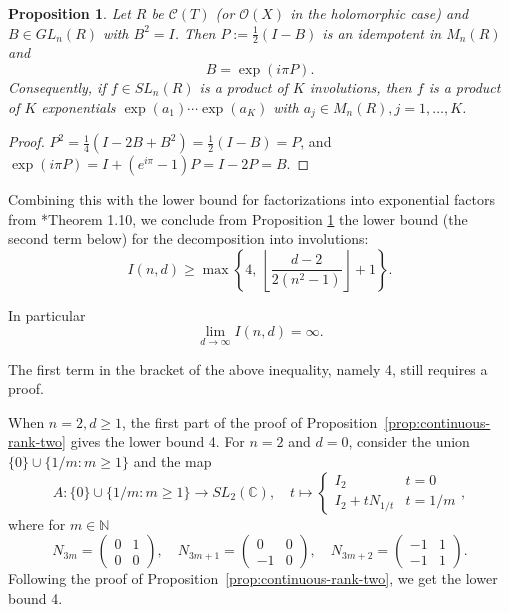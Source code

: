 \documentclass{amsart}
\newcommand{\C}{\mathbb{C}}
\newcommand{\Id}{I}
\newtheorem{proposition}[theorem]{Proposition}
\theoremstyle{definition}
\begin{document}
\begin{proposition}\label{prop:exp}
Let $R$ be $\mathcal{C}(T)$ (or $\mathcal O(X)$ in the holomorphic case) and $B\in GL_n(R)$ with $B^2=\Id$. Then $P:=\tfrac12(\Id-B)$ is an idempotent
in $M_n(R)$ and
\[
B=\exp(i\pi P).
\]
Consequently, if $f\in SL_n(R)$ is a product of $K$ involutions, then $f$ is a product of $K$ exponentials
$\exp(a_1)\cdots\exp(a_K)$ with $a_j\in M_n(R), j = 1, \dots,K$.
\end{proposition}

\begin{proof}
$P^2=\tfrac14(\Id-2B+B^2)=\tfrac12(\Id-B)=P$, and $\exp(i\pi P)=\Id+(e^{i\pi}-1)P=\Id-2P=B$.
\end{proof}

Combining this with the lower bound for factorizations into exponential factors from \cite{MR1305876}*{Theorem 1.10}, we conclude from Proposition \ref{prop:exp} the lower bound (the second term below) for the decomposition into involutions:
\begin{equation}\label{lower-bound}
    I(n,d)\ge \max \left\{ 4,   \ \left\lfloor \frac{d - 2}{2 (n^2 -1)} \right\rfloor + 1 \right\}.\end{equation}

In particular $$\lim_{d \to \infty} I(n,d) = \infty.$$

The first term in the bracket of the above inequality, namely 4, still requires a proof.  

When $n=2, d\ge 1$, the first part of the proof of Proposition~\ref{prop:continuous-rank-two}
gives the lower bound 4. For $n=2$ and $d=0$, consider  the union $\{0\}\cup\{1/m:m\geq1\}$ and the map 
\[
 A : \{0\}\cup\{1/m:m\geq1\} \to SL_2(\C), \quad t \mapsto \begin{cases}
     I_2 & t = 0 \\
     I_2+ t N_{1/t} &  t = 1/m
 \end{cases},
\]
where for $m \in \mathbb{N}$
\[
 N_{3m}=\begin{pmatrix}0&1\\0&0\end{pmatrix},\quad
 N_{3m+1}=\begin{pmatrix}0&0\\-1&0\end{pmatrix},\quad
 N_{3m+2}= \begin{pmatrix}-1&1\\-1&1\end{pmatrix}.
\]
Following the proof of Proposition~\ref{prop:continuous-rank-two}, we get the lower bound 4. 
\end{document}
